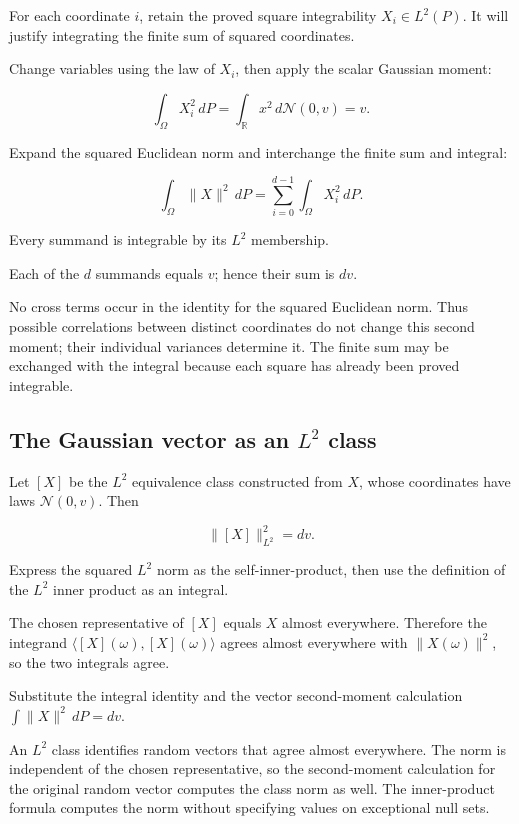 \documentclass[11pt,a4paper]{article}
\begin{document}
For each coordinate \(i\), retain the proved square integrability \(X_i\in L^2(P)\). It will justify integrating the finite sum of squared coordinates.



Change variables using the law of \(X_i\), then apply the scalar Gaussian moment:

\[\int_\Omega X_i^2\,dP=\int_{\mathbb R}x^2\,d\mathcal N(0,v)=v.\]

Expand the squared Euclidean norm and interchange the finite sum and integral:

\[\int_\Omega\|X\|^2\,dP=\sum_{i=0}^{d-1}\int_\Omega X_i^2\,dP.\]

Every summand is integrable by its \(L^2\) membership.



Each of the \(d\) summands equals \(v\); hence their sum is \(dv\).



No cross terms occur in the identity for the squared Euclidean norm. Thus possible correlations between distinct coordinates do not change this second moment; their individual variances determine it. The finite sum may be exchanged with the integral because each square has already been proved integrable.


\subsection{\texorpdfstring{The Gaussian vector as an \(L^2\) class}{The Gaussian vector as an L² class}}


Let \([X]\) be the \(L^2\) equivalence class constructed from \(X\), whose coordinates have laws \(\mathcal N(0,v)\). Then

\[\|[X]\|_{L^2}^2=dv.\]

Express the squared \(L^2\) norm as the self-inner-product, then use the definition of the \(L^2\) inner product as an integral.



The chosen representative of \([X]\) equals \(X\) almost everywhere. Therefore the integrand \(\langle[X](\omega),[X](\omega)\rangle\) agrees almost everywhere with \(\|X(\omega)\|^2\), so the two integrals agree.



Substitute the integral identity and the vector second-moment calculation \(\int\|X\|^2\,dP=dv\).



An \(L^2\) class identifies random vectors that agree almost everywhere. The norm is independent of the chosen representative, so the second-moment calculation for the original random vector computes the class norm as well. The inner-product formula computes the norm without specifying values on exceptional null sets.
\end{document}
